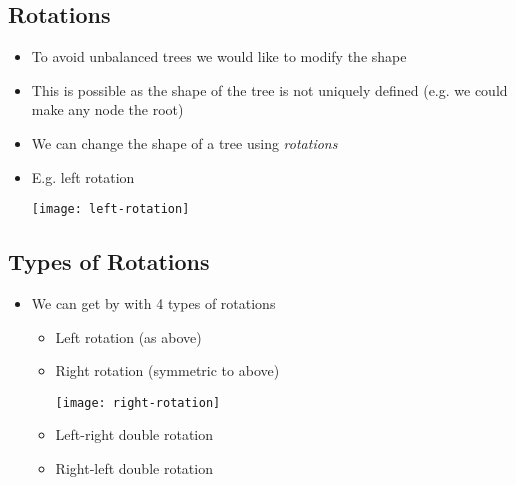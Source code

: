 \begin{slide}
\section[-2]{Rotations}

\begin{PauseHighLight}
  \begin{itemize}
  \item To avoid unbalanced trees we would like to modify the
    shape\pauseh
  \item This is possible as the shape of the tree is not uniquely
    defined (e.g. we could make any node the root)\pauseh
  \item We can change the shape of a tree using \emph{rotations}\pauseh
  \item E.g. left rotation
  \begin{center}
    \texttt{[image: left-rotation]}\pause
  \end{center}
  \end{itemize}
\end{PauseHighLight}

\end{slide}


\begin{slide}
\section[-2]{Types of Rotations}

\begin{PauseHighLight}
  \begin{itemize}
  \item We can get by with 4 types of rotations\pause
    \begin{itemize}
    \item Left rotation (as above)\pause
    \item Right rotation (symmetric to above)
    \begin{center}
      \texttt{[image: right-rotation]}\pause
    \end{center}
    \item Left-right double rotation\pause
    \item Right-left double rotation\pause
    \end{itemize}
  \end{itemize}
\end{PauseHighLight}

\end{slide}

